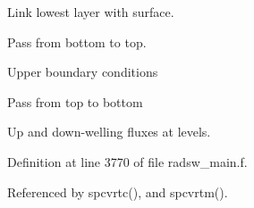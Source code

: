 \begin{DoxyEnumerate}
\item Link lowest layer with surface.
\item Pass from bottom to top.
\item Upper boundary conditions
\item Pass from top to bottom
\item Up and down-\/welling fluxes at levels. 
\end{DoxyEnumerate}

Definition at line 3770 of file radsw\+\_\+main.\+f.



Referenced by spcvrtc(), and spcvrtm().

